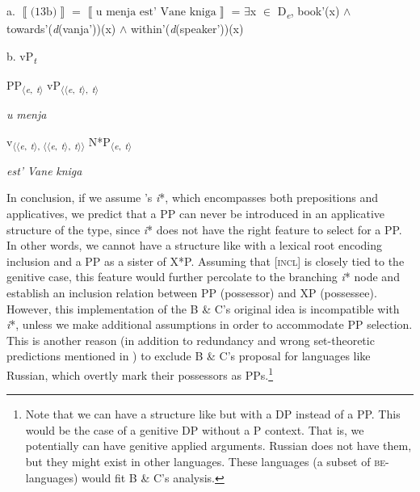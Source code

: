 \documentclass[output=paper,colorlinks,citecolor=brown]{./langscibook}
\begin{document}
\ea%
    \label{ex:tsedryk:26}
    \gll\\
        \\
    \glt
    \z

          a.   $\left\llbracket \text{(13b)}\right\rrbracket $  =  $\left\llbracket \text{u menja est’ Vane kniga}\right\rrbracket $   = ${\exists}$x ${\in}$ D\textit{\textsubscript{e}}, book'(x) ${\wedge}$ towards'(\textit{d}(vanja'))(x) ${\wedge}$ within'(\textit{d}(speaker'))(x)

  b.  vP\textit{\textsubscript{t}}


  PP\textsubscript{${\langle}$}\textit{\textsubscript{e}}\textsubscript{,} \textit{\textsubscript{t}}\textsubscript{${\rangle}$}  vP\textsubscript{${\langle}{\langle}$}\textit{\textsubscript{e}}\textsubscript{,} \textit{\textsubscript{t}}\textsubscript{${\rangle}$,} \textit{\textsubscript{t}}\textsubscript{${\rangle}$}

  \textit{u} \textit{menja}

  v\textsubscript{${\langle}{\langle}$}\textit{\textsubscript{e}}\textsubscript{,} \textit{\textsubscript{t}}\textsubscript{${\rangle}$, ${\langle}{\langle}$}\textit{\textsubscript{e}}\textsubscript{,} \textit{\textsubscript{t}}\textsubscript{${\rangle}$,} \textit{\textsubscript{t}}\textsubscript{${\rangle}{\rangle}$}  N*P\textsubscript{${\langle}$}\textit{\textsubscript{e}}\textsubscript{,} \textit{\textsubscript{t}}\textsubscript{${\rangle}$}

  \textit{est’}  \textit{Vane} \textit{kniga}

In conclusion, if we assume \citeauthor{WoodMarantz2017}’s \textit{i}*, which encompasses both prepositions and applicatives, we predict that a PP can never be introduced in an applicative structure of the  type, since \textit{i}* does not have the right feature to select for a PP. In other words, we cannot have a structure like  with a lexical root encoding inclusion and a PP as a sister of X*P. Assuming that [\textsc{incl}] is closely tied to the genitive case, this feature would further percolate to the branching \textit{i}* node and establish an inclusion relation between PP (possessor) and XP (possessee). However, this implementation of the B \& C’s original idea is incompatible with \textit{i}*, unless we make additional assumptions in order to accommodate PP selection. This is another reason (in addition to redundancy and wrong set-theoretic predictions mentioned in ) to exclude B \& C’s proposal for languages like Russian, which overtly mark their possessors as PPs.\footnote{Note that we can have a structure like  but with a DP instead of a PP. This would be the case of a genitive DP without a P context. That is, we potentially can have genitive applied arguments. Russian does not have them, but they might exist in other languages. These languages (a subset of \textsc{be}{}-languages) would fit B \& C’s analysis.}    
\end{document}
